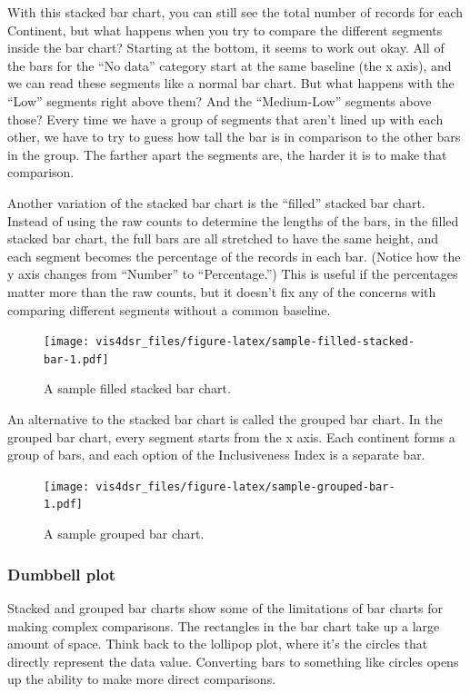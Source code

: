 \documentclass[
]{krantz}
\begin{document}
With this stacked bar chart, you can still see the total number of records for each Continent,
but what happens when you try to compare the different segments inside the
bar chart? Starting at the bottom, it seems to work out okay. All of the bars
for the ``No data'' category start at the same baseline (the x axis), and we can
read these segments like a normal bar chart. But what happens with the ``Low'' segments
right above them? And the ``Medium-Low'' segments above those? Every time we have
a group of segments that aren't lined up with each other, we have to try to guess
how tall the bar is in comparison to the other bars in the group. The farther
apart the segments are, the harder it is to make that comparison.

Another variation of the stacked bar chart is the ``filled'' stacked bar chart.
Instead of using the raw counts to determine the lengths of the bars, in the
filled stacked bar chart, the full bars are all stretched to have the same height,
and each segment becomes the percentage of the records in each bar. (Notice how
the y axis changes from ``Number'' to ``Percentage.'') This is useful if the percentages
matter more than the raw counts, but it doesn't fix any of the concerns with
comparing different segments without a common baseline.

\begin{figure}
\centering
\texttt{[image: vis4dsr\_files/figure-latex/sample-filled-stacked-bar-1.pdf]}
\caption{\label{fig:sample-filled-stacked-bar}A sample filled stacked bar chart.}
\end{figure}

An alternative to the stacked bar chart is called the grouped bar chart. In the
grouped bar chart, every segment starts from the x axis. Each continent forms a
group of bars, and each option of the Inclusiveness Index is a separate bar.

\begin{figure}
\centering
\texttt{[image: vis4dsr\_files/figure-latex/sample-grouped-bar-1.pdf]}
\caption{\label{fig:sample-grouped-bar}A sample grouped bar chart.}
\end{figure}

\hypertarget{dumbbell-plot}{%
\subsubsection{Dumbbell plot}\label{dumbbell-plot}}

Stacked and grouped bar charts show some of the limitations of bar charts for
making complex comparisons. The rectangles in the bar chart take up a large amount
of space. Think back to the lollipop plot, where it's the circles that directly
represent the data value. Converting bars to something like circles opens up the
ability to make more direct comparisons.
\end{document}

